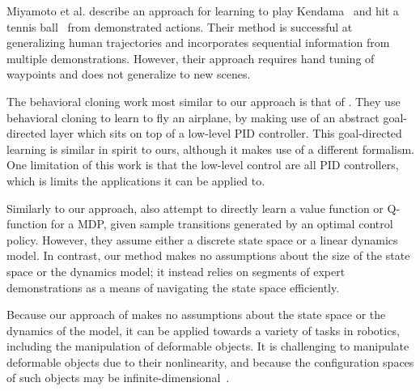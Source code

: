 Miyamoto et al. describe an approach for learning to play Kendama~\cite{Miyamoto_1996} and hit a tennis ball~\cite{Miyamoto_1998} from demonstrated actions. 
Their method is successful at generalizing human trajectories and incorporates sequential information from multiple demonstrations.
However, their approach requires hand tuning of waypoints and does not generalize to new scenes.

The behavioral cloning work most similar to our approach is that of \citet{Isaac_ICML2003}.
They use behavioral cloning to learn to fly an airplane, by making use of an abstract goal-directed layer which sits on top of a low-level PID controller.
This goal-directed learning is similar in spirit to ours, although it makes use of a different formalism.
One limitation of this work is that the low-level control are all PID controllers, which is 
limits the applications it can be applied to.

Similarly to our approach, \citet{Dvijotham_ICML2010} also attempt to directly
learn a value function or Q-function for a MDP, given sample transitions
generated by an optimal control policy. However, they assume either a discrete
state space or a linear dynamics model. In contrast, our method makes no
assumptions about the size of the state space or the dynamics model; it instead
relies on segments of expert demonstrations as a means of navigating the state
space efficiently. 


 
Because our approach of \mmql{} makes no assumptions about the state space
or the dynamics of the model, it can be applied towards a variety of tasks
in robotics, including the manipulation of deformable objects.
It is challenging to manipulate deformable objects due to their nonlinearity,
and because the configuration spaces of such objects may be
infinite-dimensional~\cite{Lamiraux_IJRR2001}.


